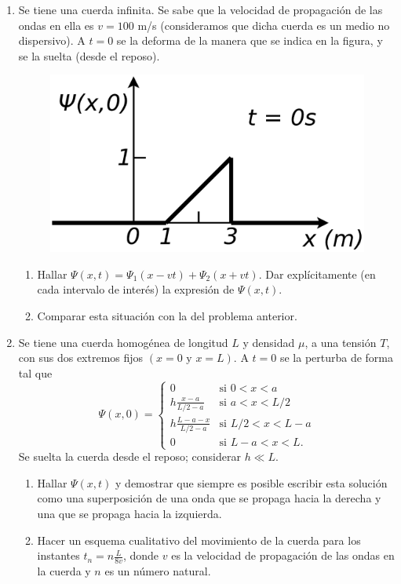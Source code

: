 \documentclass[11pt,spanish,a4paper]{article}
\begin{document}
\begin{enumerate}
\item Se tiene una cuerda infinita. Se sabe que la velocidad de propagación
de las ondas en ella es $v=100$ m/s (consideramos que dicha cuerda
es un medio no dispersivo). A $t=0$ se la deforma de la manera que
se indica en la figura, y se la suelta (desde el reposo).
\begin{figure}[H]
\centering{}\includegraphics[clip,scale=0.25]{ej2-3}
\end{figure}
\begin{enumerate}
\item Hallar $\Psi(x,t)=\Psi_{1}(x-vt)+\Psi_{2}(x+vt)$. Dar explícitamente
(en cada intervalo de interés) la expresión de $\Psi(x,t)$.
\item Comparar esta situación con la del problema anterior.
\end{enumerate}


\item Se tiene una cuerda homogénea de longitud $L$ y densidad $\mu$,
a una tensión $T$, con sus dos extremos fijos $(x=0\mbox{ y }x=L)$.
A $t=0$ se la perturba de forma tal que
\[
\Psi(x,0)=\begin{cases}
0 & \mbox{si }0<x<a\\
h\frac{x-a}{L/2-a} & \mbox{si }a<x<L/2\\
h\frac{L-a-x}{L/2-a} & \mbox{si }L/2<x<L-a\\
0 & \mbox{si }L-a<x<L.
\end{cases}
\]
Se suelta la cuerda desde el reposo; considerar $h\ll L$.
\begin{enumerate}


\item Hallar $\Psi(x,t)$ y demostrar que siempre es posible escribir esta
solución como una superposición de una onda que se propaga hacia la
derecha y una que se propaga hacia la izquierda.
\item Hacer un esquema cualitativo del movimiento de la cuerda para los
instantes $t_{n}=n\frac{L}{8v}$, donde $v$ es la velocidad de propagación
de las ondas en la cuerda y $n$ es un número natural.
\end{enumerate}



\end{enumerate}
\end{document}
